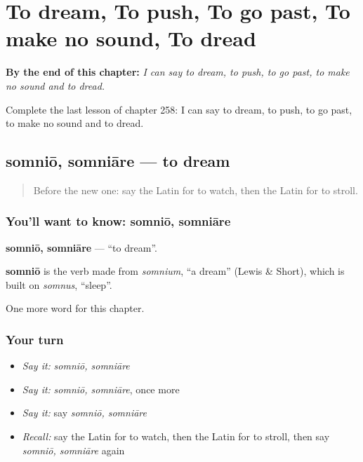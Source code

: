 
\chapter{To dream, To push, To go past, To make no sound, To dread}
\label{ch:la-to-dream-to-push-to-go-past-to-make-no-sound-to-dread}

\begin{chapteropening}
\textbf{By the end of this chapter:} \emph{I can say to dream, to push, to go past, to make no sound and to dread.}

Complete the last lesson of chapter 258: I can say to dream, to push, to go past, to make no sound and to dread.
\end{chapteropening}

\section[somniō, somniāre]{somniō, somniāre — to dream}

\label{lesson:LA-C258-somnio}



\begin{quote}
Before the new one: say the Latin for to watch, then the Latin for to stroll.
\end{quote}

\subsection*{You'll want to know: somniō, somniāre}
\textbf{somniō, somniāre} — \textquotedblleft{}to dream\textquotedblright{}.

\begin{cousinweb}
\textbf{somniō} is the verb made from \emph{somnium}, \textquotedblleft{}a dream\textquotedblright{} (Lewis \& Short), which is built on \emph{somnus}, \textquotedblleft{}sleep\textquotedblright{}.
\end{cousinweb}

\begin{grammarlens}[title={What you've built}]
One more word for this chapter.
\end{grammarlens}

\subsection*{Your turn}
\begin{itemize}
\raggedright
  \item \emph{Say it:} \emph{somniō, somniāre}
  \item \emph{Say it:} \emph{somniō, somniāre}, once more
  \item \emph{Say it:} say \emph{somniō, somniāre}
  \item \emph{Recall:} say the Latin for to watch, then the Latin for to stroll, then say \emph{somniō, somniāre} again
\end{itemize}

